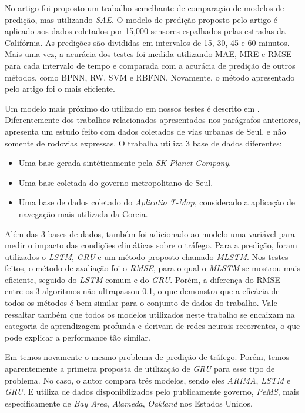 No artigo \cite{lv_6894591} foi proposto um trabalho semelhante de comparação de modelos de predição, mas utilizando \textit{\acrfull{SAE}}. O modelo de predição proposto pelo artigo é aplicado aos dados coletados por 15,000 sensores espalhados pelas estradas da Califórnia. As predições são divididas em intervalos de 15, 30, 45 e 60 minutos. Mais uma vez, a acurácia dos testes foi medida utilizando  \acrshort{MAE}, \acrshort{MRE} e \acrshort{RMSE} para cada intervalo de tempo e comparada com a acurácia de predição de outros métodos, como \acrfull{BPNN}, \acrfull{RW}, \acrfull{SVM} e \acrfull{RBFNN}. Novamente, o método apresentado pelo artigo foi o mais eficiente.      

Um modelo mais próximo do utilizado em nossos testes é descrito em \cite{Seoul}. Diferentemente dos trabalhos relacionados apresentados nos parágrafos anteriores, \cite{Seoul} apresenta um estudo feito com dados coletados de vias urbanas de Seul, e não somente de rodovias expressas. O trabalha utiliza 3 base de dados diferentes:

\begin{itemize}
    \item Uma base gerada sintéticamente pela \textit{SK Planet Company}.
    \item Uma base coletada do governo metropolitano de Seul.
    \item Uma base de dados coletado do \textit{Aplicatio T-Map}, considerado a aplicação de navegação mais utilizada da Coreia.
\end{itemize} 

Além das 3 bases de dados, também foi adicionado ao modelo uma variável para medir o impacto das condições climáticas sobre o tráfego.
Para a predição, foram utilizados o \textit{\acrshort{LSTM}}, \textit{\acrshort{GRU}} e um método proposto chamado \textit{\acrfull{MLSTM}}. Nos testes feitos, o método de avaliação foi o \textit{\acrshort{RMSE}}, para o qual o \textit{\acrshort{MLSTM}} se mostrou mais eficiente, seguido do \textit{\acrshort{LSTM}} comum e do \textit{\acrshort{GRU}}. Porém, a diferença do RMSE entre os 3 algoritmos não ultrapassou 0.1, o que demonstra que a eficácia de todos os métodos é bem similar para o conjunto de dados do trabalho. Vale ressaltar também que todos os modelos utilizados neste trabalho se encaixam na categoria de aprendizagem profunda e derivam de redes neurais recorrentes, o que pode explicar a performance tão similar.

Em \cite{fu2016using} temos novamente o mesmo problema de predição de tráfego. Porém, temos aparentemente a primeira proposta de utilização de \textit{\acrfull{GRU}} para esse tipo de problema. No caso, o autor compara três modelos, sendo eles \textit{\acrshort{ARIMA}}, \textit{\acrshort{LSTM}} e \textit{\acrshort{GRU}}. E utiliza de dados disponibilizados pelo publicamente governo, \textit{PeMS}, mais especificamente de \textit{Bay Area}, \textit{Alameda}, \textit{Oakland} nos Estados Unidos. 

